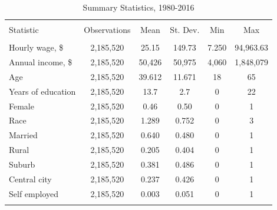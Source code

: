 \documentclass[notitlepage,12pt]{article}
\newcommand{\1}[1]{\ensuremath{\mathbb{1}\left( #1 \right)}}               %
\begin{document}
\begin{table}[!htbp] \centering 
  \caption{Summary Statistics, 1980-2016} 
  \label{tab:summarystats}
    \begin{tabular}{@{\extracolsep{5pt}}lccccc} \\[-1.8ex]\hline 
\hline \\[-1.8ex]
Statistic & \multicolumn{1}{c}{Observations} & \multicolumn{1}{c}{Mean} & \multicolumn{1}{c}{St. Dev.} & \multicolumn{1}{c}{Min} & \multicolumn{1}{c}{Max} \\ 
\hline \\[-1.8ex] 
Hourly wage, \$ & 2,185,520 & 25.15 & 149.73 & 7.250 & 94,963.63 \\  
Annual income, \$ & 2,185,520 & 50,426& 50,975 & 4,060 & 1,848,079 \\ 
Age & 2,185,520 & 39.612 & 11.671 & 18 & 65 \\ 
Years of education & 2,185,520 & 13.7 & 2.7 & 0 & 22 \\ 
Female & 2,185,520 & 0.46 & 0.50 & 0 & 1 \\ 
Race & 2,185,520 & 1.289 & 0.752 & 0 & 3 \\ 
Married & 2,185,520 & 0.640 & 0.480 & 0 & 1 \\ 
Rural & 2,185,520 & 0.205 & 0.404 & 0 & 1 \\ 
Suburb & 2,185,520 & 0.381 & 0.486 & 0 & 1 \\ 
Central city & 2,185,520 & 0.237 & 0.426 & 0 & 1 \\ 
Self employed & 2,185,520 & 0.003 & 0.051 & 0 & 1 \\ 
\hline \\[-1.8ex] 
\end{tabular} 
\end{table}
\end{document}
